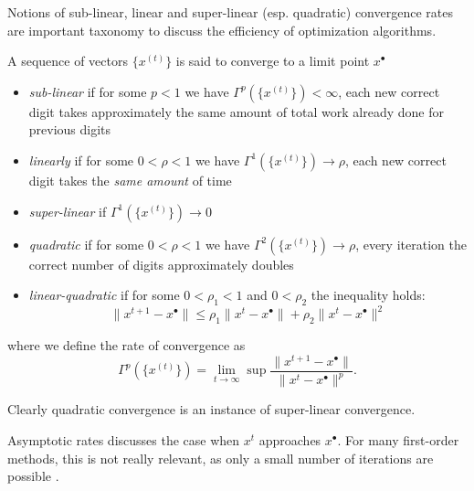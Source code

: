 \documentclass{article}
\newcommand{\optimal}[1]{{#1^{\scriptscriptstyle\bullet}}}
\begin{document}
\begin{definition}[label=v_o4l6wn, name=Asymptotic Convergence Rates]
	Notions of sub-linear, linear and super-linear (esp. quadratic) convergence rates are important taxonomy to discuss the efficiency of optimization algorithms.

	A sequence of vectors \( \{ x^{(t)} \} \) is said to converge to a limit point \( \optimal{x} \)
	\begin{itemize}
		\item \emph{sub-linear} if for some \( p < 1 \) we have \( \Gamma^p(\{x^{(t)} \}) < \infty \), each new correct digit takes approximately the same amount of total work already done for previous digits
		\item \emph{linearly} if for some \( 0 < \rho < 1 \) we have \(\Gamma^1(\{x^{(t)} \}) \to \rho\), each new correct digit takes the \emph{same amount} of time
		\item \emph{super-linear} if \( \Gamma^1(\{x^{(t)} \}) \to 0 \)
		\item \emph{quadratic} if for some \( 0 < \rho < 1 \) we have \( \Gamma^2(\{x^{(t)} \}) \to \rho \), every iteration the correct number of digits approximately doubles
		\item \emph{linear-quadratic} if for some \( 0 < \rho_1 < 1 \) and \( 0 < \rho_2 \) the inequality holds:
			\[
				\lVert x^{t+1} - \optimal{x}\rVert \leq \rho_1\lVert x^t - \optimal{x}\rVert + \rho_2\lVert x^t - \optimal{x}\rVert^2
			\]
	\end{itemize}
	where we define the rate of convergence as
	\[
		\Gamma^p(\{x^{(t)} \}) = \lim_{t\to\infty}\sup\frac{\lVert x^{t+1} - \optimal{x}\rVert}{\lVert x^t - \optimal{x}\rVert^p}.
	\]

	Clearly quadratic convergence is an instance of super-linear convergence.

	\begin{example}[label=ok2t_031, name=Sublinear Convergence in First-Order Methods]
		Asymptotic rates discusses the case when \( x^t \) approaches \( \optimal{x} \). For many first-order methods, this is not really relevant, as only a small number of iterations are possible \cite{sublinear_rate}.
	\end{example}

\end{definition}
\end{document}
